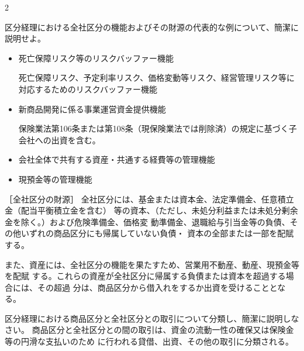 2\documentclass[report,gutter=10mm,fore-edge=10mm,uplatex,dvipdfmx]{jlreq}
\begin{document}
区分経理における全社区分の機能およびその財源の代表的な例について、簡潔に説明せよ。
\answer{}

\begin{itemize}
\item[]  死亡保障リスク等のリスクバッファー機能\par
  死亡保障リスク、予定利率リスク、価格変動等リスク、経営管理リスク等に対応するためのリスクバッファー機能
\item[]  新商品開発に係る事業運営資金提供機能\par
  保険業法第106条または第108条（現保険業法では削除済）の規定に基づく子会社への出資を含む。
\item[]  会社全体で共有する資産・共通する経費等の管理機能
\item[]  現預金等の管理機能
\end{itemize}

［全社区分の財源］
全社区分には、基金または資本金、法定準備金、任意積立金（配当平衡積立金を含む）
等の資本、（ただし、未処分利益または未処分剰余金を除く。）および危険準備金、価格変
動準備金、退職給与引当金等の負債、その他いずれの商品区分にも帰属していない負債・
資本の全部または一部を配賦する。

また、資産には、全社区分の機能を果たすため、営業用不動産、動産、現預金等を配賦
する。これらの資産が全社区分に帰属する負債または資本を超過する場合には、その超過
分は、商品区分から借入れをするか出資を受けることとなる。

区分経理における商品区分と全社区分との取引について分類し、簡潔に説明しなさい。
\answer{}
商品区分と全社区分との間の取引は、資金の流動一性の確保又は保険金等の円滑な支払いのため
に行われる貸借、出資、その他の取引に分類される。
\end{document}
